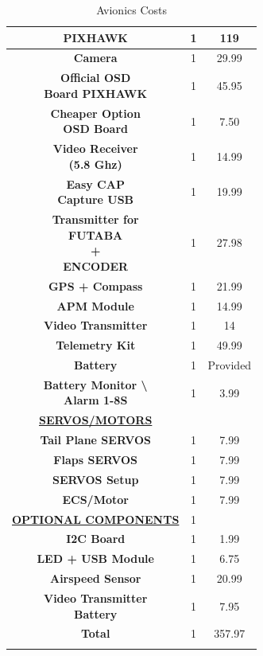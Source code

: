 \documentclass[12pt]{article}
\begin{document}
\begin{longtable}{ | c | c | c |}
    \textbf{PIXHAWK} & 1 & 119 \\ 
    \hline
    \textbf{Camera} & 1 & 29.99 \\ 
    \hline
    \makecell{\textbf{Official OSD} \\ \textbf{Board PIXHAWK}} & 1 & 45.95 \\ 
    \hline
    \makecell{\textbf{Cheaper Option} \\ \textbf{OSD Board}} & 1 & 7.50 \\ 
    \hline
    \makecell{\textbf{Video Receiver} \\ \textbf{(5.8 Ghz)}} & 1 & 14.99 \\ 
    \hline
    \makecell{\textbf{Easy CAP} \\ \textbf{Capture USB}} & 1 & 19.99 \\ 
    \hline
    \makecell{\textbf{Transmitter for} \\ \textbf{FUTABA} \\ \textbf{+} \\ \textbf{ENCODER}} & 1 & 27.98 \\ 
    \hline
    \textbf{GPS + Compass} & 1 & 21.99 \\ 
    \hline
    \textbf{APM Module} & 1 & 14.99 \\ 
    \hline
    \textbf{Video Transmitter} & 1 & 14 \\ 
    \hline 
    \textbf{Telemetry Kit} & 1 & 49.99 \\ 
    \hline
    \textbf{Battery} & 1 & Provided\\ 
    \hline
    \makecell{\textbf{Battery Monitor \textbackslash } \\ \textbf{Alarm 1-8S}} & 1 & 3.99 \\
    \hline
    \underline{\textbf{SERVOS/MOTORS}} & & \\ 
    \hline
    \textbf{Tail Plane SERVOS} & 1 & 7.99\\ 
    \hline
    \textbf{Flaps SERVOS} & 1 & 7.99\\ 
    \hline 
    \textbf{SERVOS Setup} & 1 & 7.99\\ 
    \hline
    \textbf{ECS/Motor} & 1 & 7.99\\ 
    \hline 
    \underline{\textbf{OPTIONAL COMPONENTS}} & 1 & \\ 
    \hline
    \textbf{I2C Board} & 1 & 1.99 \\ 
    \hline
    \textbf{LED + USB Module} & 1 & 6.75 \\ 
    \hline
    \textbf{Airspeed Sensor} & 1 & 20.99 \\ 
    \hline
    \makecell{\textbf{Video Transmitter} \\ \textbf{Battery}} & 1 & 7.95 \\ 
    \hline
    \textbf{Total} & 1 & 357.97\\ 
    \hline
    \caption{Avionics Costs}\\
\end{longtable}
\end{document}
